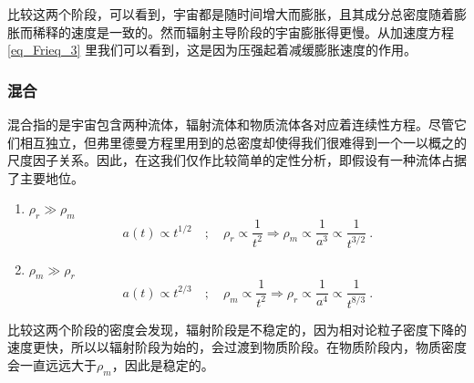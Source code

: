 比较这两个阶段，可以看到，宇宙都是随时间增大而膨胀，且其成分总密度随着膨胀而稀释的速度是一致的。然而辐射主导阶段的宇宙膨胀得更慢。从加速度方程\autoref{eq_Frieq_3} 里我们可以看到，这是因为压强起着减缓膨胀速度的作用。
\subsubsection{混合}

混合指的是宇宙包含两种流体，辐射流体和物质流体各对应着连续性方程。尽管它们相互独立，但弗里德曼方程里用到的总密度却使得我们很难得到一个一以概之的尺度因子关系。因此，在这我们仅作比较简单的定性分析，即假设有一种流体占据了主要地位。
\begin{enumerate}
\item $\rho_r\gg\rho_m$
\begin{equation}
a(t) \propto t^{1 / 2} \quad ; \quad \rho_{r} \propto \frac{1}{t^{2}}  \Longrightarrow\rho_{m} \propto \frac{1}{a^{3}} \propto \frac{1}{t^{3 / 2}}~.
\end{equation}
\item $\rho_m\gg\rho_r$
\begin{equation}
a(t) \propto t^{2 / 3} \quad ; \quad \rho_{m} \propto \frac{1}{t^{2}}  \Longrightarrow\rho_{r} \propto \frac{1}{a^{4}} \propto \frac{1}{t^{8 / 3}}~.
\end{equation}
\end{enumerate}

比较这两个阶段的密度会发现，辐射阶段是不稳定的，因为相对论粒子密度下降的速度更快，所以以辐射阶段为始的，会过渡到物质阶段。在物质阶段内，物质密度会一直远远大于$\rho_m$，因此是稳定的。